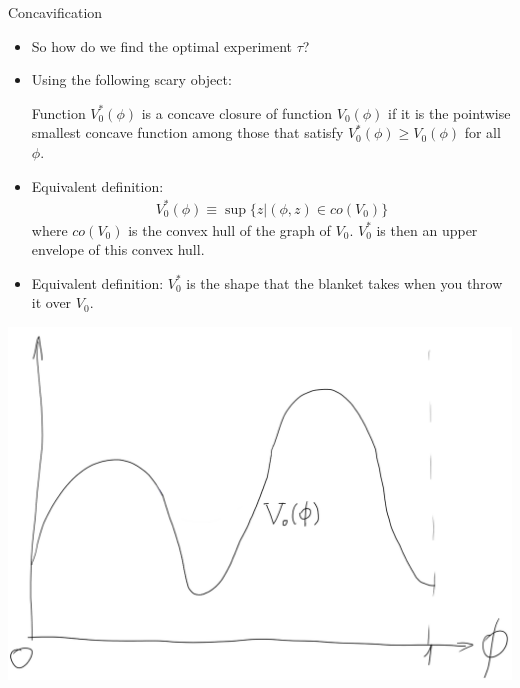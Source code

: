\documentclass[english,10pt
,aspectratio=169
]{beamer}
\begin{document}
\begin{frame}{Concavification}
\begin{itemize}
	\item So how do we find the optimal experiment $\tau$?
	\item Using the following scary object:
	\begin{definition}
		Function $V_0^*(\phi)$ is a \alert{concave closure} of function $V_0(\phi)$ if it is the pointwise smallest concave function among those that satisfy $V_0^*(\phi) \geq V_0(\phi)$ for all $\phi$.
	\end{definition}
	\item Equivalent definition:
	\begin{align*}
		V_0^*(\phi) \equiv \sup \{ z | (\phi,z) \in co(V_0) \}
	\end{align*}
	where $co(V_0)$ is the convex hull of the graph of $V_0$. $V^*_0$ is then an upper envelope of this convex hull.
	\item Equivalent definition: $V_0^*$ is the shape that the blanket takes when you throw it over $V_0$.
\end{itemize}
\end{frame}


%	


\begin{frame}
	\centering
	\includegraphics[scale=0.3]{pics/M7/concav1.png}
\end{frame}
\end{document}
